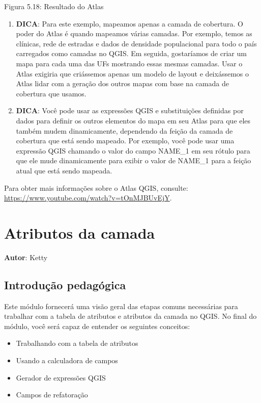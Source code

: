 \documentclass[
  portuguese,
]{krantz}
\providecommand{\tightlist}{%
  \setlength{\itemsep}{0pt}\setlength{\parskip}{0pt}}
\begin{document}
Figura 5.18: Resultado do Atlas

\begin{enumerate}
\def\labelenumi{\arabic{enumi}.}
\setcounter{enumi}{6}
\item
  \textbf{DICA}: Para este exemplo, mapeamos apenas a camada de cobertura. O poder do Atlas é quando mapeamos várias camadas. Por exemplo, temos as clínicas, rede de estradas e dados de densidade populacional para todo o país carregados como camadas no QGIS. Em seguida, gostaríamos de criar um mapa para cada uma das UFs mostrando essas mesmas camadas. Usar o Atlas exigiria que criássemos apenas um modelo de layout e deixássemos o Atlas lidar com a geração dos outros mapas com base na camada de cobertura que usamos.
\item
  \textbf{DICA}: Você pode usar as expressões QGIS e substituições definidas por dados para definir os outros elementos do mapa em seu Atlas para que eles também mudem dinamicamente, dependendo da feição da camada de cobertura que está sendo mapeado. Por exemplo, você pode usar uma expressão QGIS chamando o valor do campo NAME\_1 em seu rótulo para que ele mude dinamicamente para exibir o valor de NAME\_1 para a feição atual que está sendo mapeada.
\end{enumerate}

Para obter mais informações sobre o Atlas QGIS, consulte: \url{https://www.youtube.com/watch?v=tOnMJBUvEjY}.

\hypertarget{atributos-da-camada}{%
\chapter{Atributos da camada}\label{atributos-da-camada}}

\textbf{Autor}: Ketty

\hypertarget{introduuxe7uxe3o-pedaguxf3gica-6}{%
\section{Introdução pedagógica}\label{introduuxe7uxe3o-pedaguxf3gica-6}}

Este módulo fornecerá uma visão geral das etapas comuns necessárias para trabalhar com a tabela de atributos e atributos da camada no QGIS. No final do módulo, você será capaz de entender os seguintes conceitos:

\begin{itemize}
\tightlist
\item
  Trabalhando com a tabela de atributos
\item
  Usando a calculadora de campos
\item
  Gerador de expressões QGIS
\item
  Campos de refatoração
\end{itemize}
\end{document}
